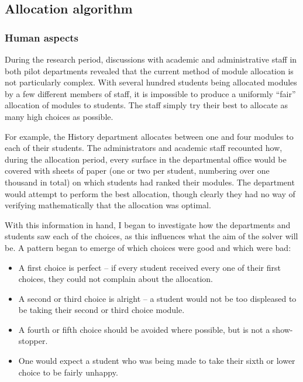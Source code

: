 
\subsection{Allocation algorithm}



\subsubsection{Human aspects}
\label{sec:algo_humanaspects}

During the research period, discussions with academic and administrative staff
in both pilot departments revealed that the current method of module
allocation is not particularly complex. With several hundred students being
allocated modules by a few different members of staff, it is impossible to
produce a uniformly ``fair'' allocation of modules to students. The staff
simply try their best to allocate as many high choices as possible.

For example, the History department allocates between one and four modules to
each of their students. The administrators and academic staff recounted how,
during the allocation period, every surface in the departmental office would
be covered with sheets of paper (one or two per student, numbering over one
thousand in total) on which students had ranked their modules. The department
would attempt to perform the best allocation, though clearly they had no way
of verifying mathematically that the allocation was optimal.

With this information in hand, I began to investigate how the departments and
students saw each of the choices, as this influences what the aim of the
solver will be. A pattern began to emerge of which choices were good and which
were bad:

\begin{itemize}
  \item A first choice is perfect -- if every student received every one of
        their first choices, they could not complain about the allocation.
  \item A second or third choice is alright -- a student would not be too
        displeased to be taking their second or third choice module.
  \item A fourth or fifth choice should be avoided where possible, but is not
        a show-stopper.
  \item One would expect a student who was being made to take their sixth or
        lower choice to be fairly unhappy.
\end{itemize}

